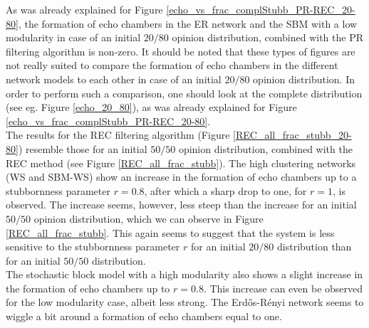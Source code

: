 \documentclass[11 pt , letterpaper , twoside , openright]{book}
\begin{document}
As was already explained for Figure \ref{echo_vs_frac_complStubb_PR-REC_20-80}, the formation of echo chambers in the ER network and the SBM with a low modularity in case of an initial $20/80$ opinion distribution, combined with the PR filtering algorithm is non-zero. It should be noted that these types of figures are not really suited to compare the formation of echo chambers in the different network models to each other in case of an initial $20/80$ opinion distribution. In order to perform such a comparison, one should look at the complete distribution (see eg. Figure \ref{echo_20_80}), as was already explained for Figure \ref{echo_vs_frac_complStubb_PR-REC_20-80}.\\
\newline
The results for the REC filtering algorithm (Figure \ref{REC_all_frac_stubb_20-80}) resemble those for an initial $50/50$ opinion distribution, combined with the REC method (see Figure \ref{REC_all_frac_stubb}). The high clustering networks (WS and SBM-WS) show an increase in the formation of echo chambers up to a stubbornness parameter $r=0.8$, after which a sharp drop to one, for $r=1$, is observed. The increase seems, however, less steep than the increase for an initial $50/50$ opinion distribution, which we can observe in Figure \ref{REC_all_frac_stubb}. This again seems to suggest that the system is less sensitive to the stubbornness parameter $r$ for an initial $20/80$ distribution than for an initial $50/50$ distribution.\\
The stochastic block model with a high modularity also shows a slight increase in the formation of echo chambers up to $r = 0.8$. This increase can even be observed for the low modularity case, albeit less strong. The Erd\H{o}s-R\'{e}nyi network seems to wiggle a bit around a formation of echo chambers equal to one.\\
\newline
\end{document}
